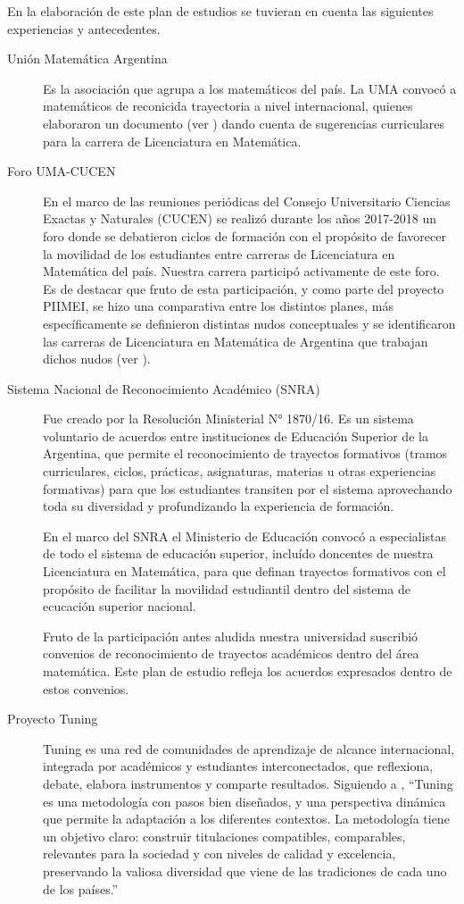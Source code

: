 \documentclass[a4paper, 12pt]{article}
\begin{document}
En la elaboración de este plan de estudios se tuvieran en cuenta las siguientes experiencias y antecedentes.
\begin{description}
 \item[Unión Matemática Argentina]  Es la asociación que agrupa a los matemáticos del país.  La UMA convocó a matemáticos de reconicida trayectoria a nivel internacional, quienes elaboraron un documento (ver \cite{uma}) 
 dando cuenta de sugerencias curriculares para la carrera de Licenciatura en Matemática.
 
 \item[Foro UMA-CUCEN] En el marco de las reuniones periódicas del Consejo Universitario Ciencias Exactas y Naturales (CUCEN) se realizó durante los años 2017-2018 un foro donde se debatieron ciclos de formación con el propósito de favorecer la movilidad de los estudiantes entre carreras de Licenciatura en Matemática del país. Nuestra carrera participó activamente de este foro. Es de destacar que fruto de esta participación, y como parte del proyecto PIIMEI, se hizo una comparativa entre los distintos planes, más específicamente se definieron distintas nudos conceptuales y se identificaron las carreras de Licenciatura en Matemática de Argentina que trabajan dichos nudos (ver \cite{CCP}). 

\item[Sistema Nacional de Reconocimiento Académico (SNRA)] Fue creado por la Resolución Ministerial N° 1870/16. Es un sistema voluntario de acuerdos entre instituciones de Educación Superior de la Argentina, que permite el reconocimiento de trayectos formativos (tramos curriculares, ciclos, prácticas, asignaturas, materias u otras experiencias formativas) para que los estudiantes transiten por el sistema aprovechando toda su diversidad y profundizando la experiencia de formación.

En el marco del SNRA el Ministerio de Educación convocó a especialistas de todo el sistema de educación superior, incluído doncentes de nuestra Licenciatura en Matemática,  para que definan trayectos formativos con el propósito de facilitar la movilidad estudiantil dentro del sistema de ecucación superior nacional. 

Fruto de la participación antes aludida nuestra universidad suscribió convenios de reconocimiento de trayectos académicos dentro del área matemática. Este plan de estudio refleja los acuerdos expresados dentro de estos convenios.

\item[Proyecto Tuning] Tuning es una red de comunidades de aprendizaje de alcance internacional, integrada por académicos y estudiantes interconectados, que reflexiona, debate, elabora instrumentos
y comparte resultados. Siguiendo a \cite{paniagua2013educacion},
 ``Tuning es una metodología con pasos bien diseñados, y una perspectiva dinámica que permite la adaptación a los diferentes contextos. La metodología tiene un objetivo claro: construir titulaciones compatibles, comparables, relevantes para la sociedad y con niveles
de calidad y excelencia, preservando la valiosa diversidad que viene de las
tradiciones de cada uno de los países.'' 


\end{description}
\end{document}

